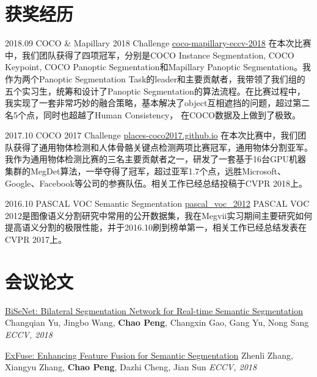 \documentclass[]{friggeri-cv}
\begin{document}
\section{获奖经历}
  \begin{entrylist}
  \entry
    {2018.09}
    {COCO \& Mapillary 2018 Challenge}
    {\href{http://cocodataset.org/workshop/coco-mapillary-eccv-2018.html}{coco-mapillary-eccv-2018}}
    {在本次比赛中，我们团队获得了四项冠军，分别是COCO Instance Segmentation, COCO Keypoint, COCO Panoptic Segmentation和Mapillary Panoptic Segmentation。我作为两个Panoptic Segmentation Task的leader和主要贡献者，我带领了我们组的五个实习生，统筹和设计了Panoptic Segmentation的算法流程。在比赛过程中，我实现了一套非常巧妙的融合策略，基本解决了object互相遮挡的问题，超过第二名5个点，同时也超越了Human Consistency，
    在COCO数据及上做到了极致。}

  \entry
    {2017.10}
    {COCO 2017 Challenge}
    {\href{https://places-coco2017.github.io/}{places-coco2017.github.io}}
    {在本次比赛中，我们团队获得了通用物体检测和人体骨骼关键点检测两项比赛冠军，通用物体分割亚军。我作为通用物体检测比赛的三名主要贡献者之一，研发了一套基于16台GPU机器集群的MegDet算法，一举夺得了冠军，超过亚军1.7个点，远胜Microsoft、Google、Facebook等公司的参赛队伍。相关工作已经总结投稿于CVPR 2018上。}

  \entry
    {2016.10}
    {PASCAL VOC Semantic Segmentation}
    {\href{http://host.robots.ox.ac.uk:8080/leaderboard/displaylb.php?challengeid=11&compid=6}{pascal\_voc\_2012}}
    {PASCAL VOC 2012是图像语义分割研究中常用的公开数据集，我在Megvii实习期间主要研究如何提高语义分割的极限性能，并于2016.10刷到榜单第一，相关工作已经总结发表在CVPR 2017上。}
  \end{entrylist}

\section{会议论文}
\href{https://arxiv.org/pdf/1808.00897.pdf}{BiSeNet: Bilateral Segmentation Network for Real-time Semantic Segmentation}\newline
Changqian Yu, Jingbo Wang, \textbf{Chao Peng}, Changxin Gao, Gang Yu, Nong Sang\newline
\emph{ECCV, 2018}

\href{https://arxiv.org/pdf/1804.03821.pdf}{ExFuse: Enhancing Feature Fusion for Semantic Segmentation}\newline
Zhenli Zhang, Xiangyu Zhang, \textbf{Chao Peng}, Dazhi Cheng, Jian Sun\newline
\emph{ECCV, 2018}
\end{document}
